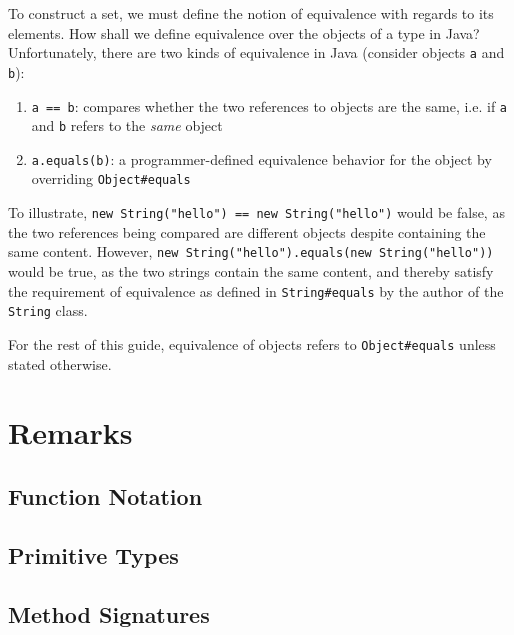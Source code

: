 \documentclass[12pt]{article}
\theoremstyle{definition}
\newcommand{\code}[1]{\colorbox{codegray}{\texttt{#1}}}
\begin{document}
	To construct a set, we must define the notion of equivalence with regards to its elements. How shall we define equivalence over the objects of a type in Java? Unfortunately, there are two kinds of equivalence in Java (consider objects \code{a} and \code{b}):
	\begin{enumerate}
		\item \code{a == b}: compares whether the two references to objects are the same, i.e. if \code{a} and \code{b} refers to the \emph{same} object
		\item \code{a.equals(b)}: a programmer-defined equivalence behavior for the object by overriding \code{Object\#equals}
	\end{enumerate}
	
	To illustrate, \code{new String("hello") == new String("hello")} would be false, as the two references being compared are different objects despite containing the same content. However, \code{new String("hello").equals(new String("hello"))} would be true, as the two strings contain the same content, and thereby satisfy the requirement of equivalence as defined in \code{String\#equals} by the author of the \code{String} class.
	
	For the rest of this guide, equivalence of objects refers to \code{Object\#equals} unless stated otherwise.
	
	\section{Remarks}
	
	\subsection{Function Notation}
	
	\subsection{Primitive Types}
	\label{sec:primitives}
	
	\subsection{Method Signatures}
	\label{sec:signature}
	
\end{document}

